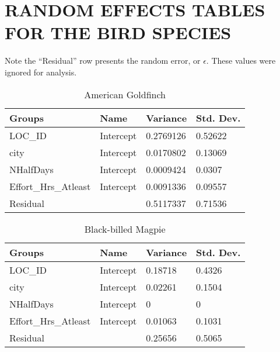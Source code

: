 
\chapter{RANDOM EFFECTS TABLES FOR THE BIRD SPECIES}


Note the ``Residual'' row presents the random error, or $\epsilon$. These values were ignored for analysis.

\begin{longtable}[c]{|l|l|l|l|}
\caption{American Goldfinch}
\label{American Goldfinch}\\
\hline
Groups               & Name      & Variance  & Std. Dev. \\ \hline
\endhead
%
LOC\_ID              & Intercept & 0.2769126 & 0.52622   \\ \hline
city                 & Intercept & 0.0170802 & 0.13069   \\ \hline
NHalfDays            & Intercept & 0.0009424 & 0.0307    \\ \hline
Effort\_Hrs\_Atleast & Intercept & 0.0091336 & 0.09557   \\ \hline
Residual             &           & 0.5117337 & 0.71536   \\ \hline
\end{longtable}

\begin{longtable}[c]{|l|l|l|l|}
\caption{Black-billed Magpie}
\label{my-label}\\
\hline
Groups               & Name      & Variance & Std. Dev. \\ \hline
\endhead
%
LOC\_ID              & Intercept & 0.18718  & 0.4326    \\ \hline
city                 & Intercept & 0.02261  & 0.1504    \\ \hline
NHalfDays            & Intercept & 0        & 0         \\ \hline
Effort\_Hrs\_Atleast & Intercept & 0.01063  & 0.1031    \\ \hline
Residual             &           & 0.25656  & 0.5065    \\ \hline
\end{longtable}

